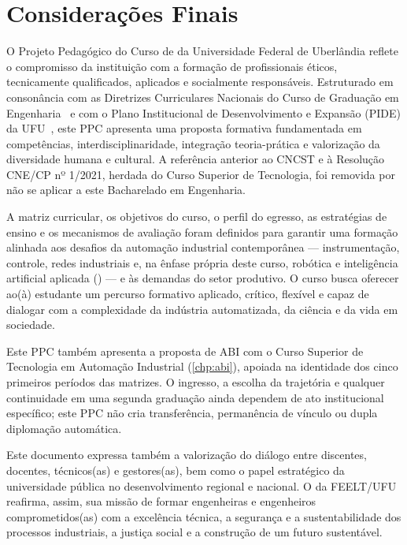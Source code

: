 \chapter{Considerações Finais}
\label{chp:consideracoes_finais}

O Projeto Pedagógico do Curso de \ppccurso da Universidade Federal de Uberlândia reflete o compromisso da instituição com a formação de profissionais éticos, tecnicamente qualificados, aplicados e socialmente responsáveis. Estruturado em consonância com as Diretrizes Curriculares Nacionais do Curso de Graduação em Engenharia~\cite{cne_ces_2_2019,cne_ces_1_2021} e com o Plano Institucional de Desenvolvimento e Expansão (PIDE) da UFU~\cite{ufu_consun_31_2022}, este PPC apresenta uma proposta formativa fundamentada em competências, interdisciplinaridade, integração teoria-prática e valorização da diversidade humana e cultural. A referência anterior ao CNCST e à Resolução CNE/CP nº 1/2021, herdada do Curso Superior de Tecnologia, foi removida por não se aplicar a este Bacharelado em Engenharia.

A matriz curricular, os objetivos do curso, o perfil do egresso, as estratégias de ensino e os mecanismos de avaliação foram definidos para garantir uma formação alinhada aos desafios da automação industrial contemporânea — instrumentação, controle, redes industriais e, na ênfase própria deste curso, robótica e inteligência artificial aplicada (\ppcenfasecurricular) — e às demandas do setor produtivo. O curso busca oferecer ao(à) estudante um percurso formativo aplicado, crítico, flexível e capaz de dialogar com a complexidade da indústria automatizada, da ciência e da vida em sociedade.

Este PPC também apresenta a proposta de ABI com o Curso Superior de Tecnologia em Automação Industrial (\autoref{chp:abi}), apoiada na identidade dos cinco primeiros períodos das matrizes. O ingresso, a escolha da trajetória e qualquer continuidade em uma segunda graduação ainda dependem de ato institucional específico; este PPC não cria transferência, permanência de vínculo ou dupla diplomação automática.

Este documento expressa também a valorização do diálogo entre discentes, docentes, técnicos(as) e gestores(as), bem como o papel estratégico da universidade pública no desenvolvimento regional e nacional. O \ppccurso da FEELT/UFU reafirma, assim, sua missão de formar engenheiras e engenheiros comprometidos(as) com a excelência técnica, a segurança e a sustentabilidade dos processos industriais, a justiça social e a construção de um futuro sustentável.
